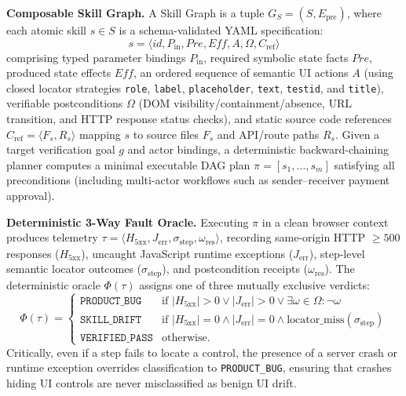 \documentclass[conference]{IEEEtran}
\begin{document}
\textbf{Composable Skill Graph.} A Skill Graph is a tuple $G_S = (S, E_{\text{pre}})$, where each atomic skill $s \in S$ is a schema-validated YAML specification:
\begin{equation}
  s = \langle \mathit{id}, P_{\text{in}}, \mathit{Pre}, \mathit{Eff}, A, \Omega, C_{\text{ref}} \rangle
\end{equation}
comprising typed parameter bindings $P_{\text{in}}$, required symbolic state facts $\mathit{Pre}$, produced state effects $\mathit{Eff}$, an ordered sequence of semantic UI actions $A$ (using closed locator strategies \texttt{role}, \texttt{label}, \texttt{placeholder}, \texttt{text}, \texttt{testid}, and \texttt{title}), verifiable postconditions $\Omega$ (DOM visibility/containment/absence, URL transition, and HTTP response status checks), and static source code references $C_{\text{ref}} = \langle F_s, R_s \rangle$ mapping $s$ to source files $F_s$ and API/route paths $R_s$. Given a target verification goal $g$ and actor bindings, a deterministic backward-chaining planner computes a minimal executable DAG plan $\pi = [s_1, \dots, s_m]$ satisfying all preconditions (including multi-actor workflows such as sender--receiver payment approval).

\textbf{Deterministic 3-Way Fault Oracle.} Executing $\pi$ in a clean browser context produces telemetry $\tau = \langle H_{5\text{xx}}, J_{\text{err}}, \sigma_{\text{step}}, \omega_{\text{res}} \rangle$, recording same-origin HTTP $\ge 500$ responses ($H_{5\text{xx}}$), uncaught JavaScript runtime exceptions ($J_{\text{err}}$), step-level semantic locator outcomes ($\sigma_{\text{step}}$), and postcondition receipts ($\omega_{\text{res}}$). The deterministic oracle $\Phi(\tau)$ assigns one of three mutually exclusive verdicts:
\begin{equation}
\Phi(\tau) =
\begin{cases}
  \texttt{PRODUCT\_BUG} & \text{if } |H_{5\text{xx}}| > 0 \lor |J_{\text{err}}| > 0 \lor \exists \omega \in \Omega: \neg \omega \\
  \texttt{SKILL\_DRIFT} & \text{if } |H_{5\text{xx}}| = 0 \land |J_{\text{err}}| = 0 \land \text{locator\_miss}(\sigma_{\text{step}}) \\
  \texttt{VERIFIED\_PASS} & \text{otherwise.}
\end{cases}
\end{equation}
Critically, even if a step fails to locate a control, the presence of a server crash or runtime exception overrides classification to \texttt{PRODUCT\_BUG}, ensuring that crashes hiding UI controls are never misclassified as benign UI drift.
\end{document}
